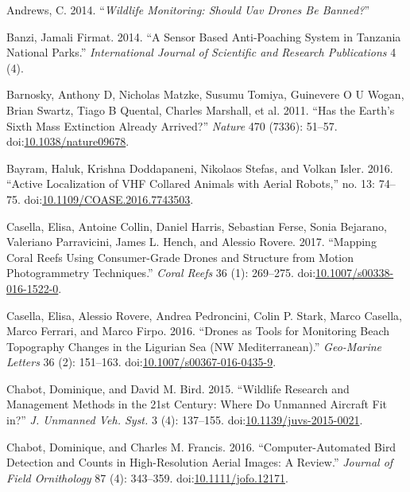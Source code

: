 \documentclass[]{interact}
\theoremstyle{plain}%
\theoremstyle{definition}
\theoremstyle{remark}
\begin{document}
\hypertarget{ref-Andrews2014}{}
Andrews, C. 2014. ``\emph{Wildlife Monitoring: Should Uav Drones Be
Banned?}''

\hypertarget{ref-banzi_sensor_2014}{}
Banzi, Jamali Firmat. 2014. ``A Sensor Based Anti-Poaching System in
Tanzania National Parks.'' \emph{International Journal of Scientific and
Research Publications} 4 (4).

\hypertarget{ref-barnosky_has_2011}{}
Barnosky, Anthony D, Nicholas Matzke, Susumu Tomiya, Guinevere O U
Wogan, Brian Swartz, Tiago B Quental, Charles Marshall, et al. 2011.
``Has the Earth's Sixth Mass Extinction Already Arrived?'' \emph{Nature}
470 (7336): 51--57.
doi:\href{https://doi.org/10.1038/nature09678}{10.1038/nature09678}.

\hypertarget{ref-bayram_active_2016}{}
Bayram, Haluk, Krishna Doddapaneni, Nikolaos Stefas, and Volkan Isler.
2016. ``Active Localization of VHF Collared Animals with Aerial
Robots,'' no. 13: 74--75.
doi:\href{https://doi.org/10.1109/COASE.2016.7743503}{10.1109/COASE.2016.7743503}.

\hypertarget{ref-casella_mapping_2017}{}
Casella, Elisa, Antoine Collin, Daniel Harris, Sebastian Ferse, Sonia
Bejarano, Valeriano Parravicini, James L. Hench, and Alessio Rovere.
2017. ``Mapping Coral Reefs Using Consumer-Grade Drones and Structure
from Motion Photogrammetry Techniques.'' \emph{Coral Reefs} 36 (1):
269--275.
doi:\href{https://doi.org/10.1007/s00338-016-1522-0}{10.1007/s00338-016-1522-0}.

\hypertarget{ref-casella_drones_2016}{}
Casella, Elisa, Alessio Rovere, Andrea Pedroncini, Colin P. Stark, Marco
Casella, Marco Ferrari, and Marco Firpo. 2016. ``Drones as Tools for
Monitoring Beach Topography Changes in the Ligurian Sea (NW
Mediterranean).'' \emph{Geo-Marine Letters} 36 (2): 151--163.
doi:\href{https://doi.org/10.1007/s00367-016-0435-9}{10.1007/s00367-016-0435-9}.

\hypertarget{ref-chabot_wildlife_2015}{}
Chabot, Dominique, and David M. Bird. 2015. ``Wildlife Research and
Management Methods in the 21st Century: Where Do Unmanned Aircraft Fit
in?'' \emph{J. Unmanned Veh. Syst.} 3 (4): 137--155.
doi:\href{https://doi.org/10.1139/juvs-2015-0021}{10.1139/juvs-2015-0021}.

\hypertarget{ref-chabot_computer-automated_2016}{}
Chabot, Dominique, and Charles M. Francis. 2016. ``Computer-Automated
Bird Detection and Counts in High-Resolution Aerial Images: A Review.''
\emph{Journal of Field Ornithology} 87 (4): 343--359.
doi:\href{https://doi.org/10.1111/jofo.12171}{10.1111/jofo.12171}.
\end{document}
